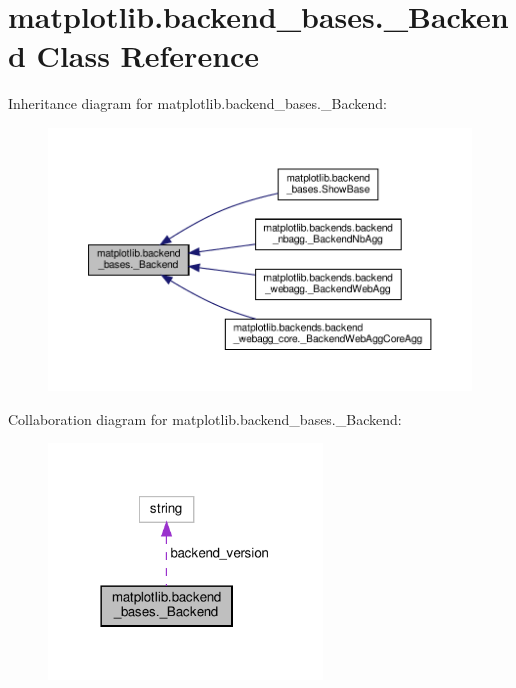 \hypertarget{classmatplotlib_1_1backend__bases_1_1__Backend}{}\section{matplotlib.\+backend\+\_\+bases.\+\_\+\+Backend Class Reference}
\label{classmatplotlib_1_1backend__bases_1_1__Backend}


Inheritance diagram for matplotlib.\+backend\+\_\+bases.\+\_\+\+Backend\+:
\nopagebreak
\begin{figure}[H]
\begin{center}
\leavevmode
\includegraphics[width=350pt]{classmatplotlib_1_1backend__bases_1_1__Backend__inherit__graph}
\end{center}
\end{figure}


Collaboration diagram for matplotlib.\+backend\+\_\+bases.\+\_\+\+Backend\+:
\nopagebreak
\begin{figure}[H]
\begin{center}
\leavevmode
\includegraphics[width=206pt]{classmatplotlib_1_1backend__bases_1_1__Backend__coll__graph}
\end{center}
\end{figure}
